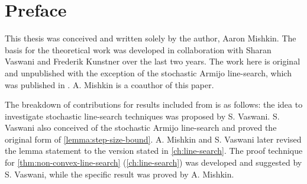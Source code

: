 
\chapter{Preface}

This thesis was conceived and written solely by the author, Aaron Mishkin. 
The basis for the theoretical work was developed in collaboration with Sharan Vaswani and Frederik Kunstner over the last two years.
The work here is original and unpublished with the exception of the stochastic Armijo line-search, which was published in \citet{vaswani2019painless}. 
A. Mishkin is a coauthor of this paper. 

The breakdown of contributions for results included from \citet{vaswani2019painless} is as follows: 
the idea to investigate stochastic line-search techniques was proposed by S. Vaswani.
S. Vaswani also conceived of the stochastic Armijo line-search and proved the original form of \autoref{lemma:step-size-bound}. 
A. Mishkin and S. Vaswani later revised the lemma statement to the version stated in \autoref{ch:line-search}.
The proof technique for \autoref{thm:non-convex-line-search} (\autoref{ch:line-search}) was developed and suggested by S. Vaswani, while the specific result was proved by A. Mishkin. 

\iffalse
The following results from \citet{vaswani2019fast} are not included in this thesis: 
\begin{inparaenum}[(i)]
    \item  the theoretical results for the stochastic Armijo line-search on strongly-convex and convex functions, which are \emph{independent} of the improved theorems in \autoref{ch:line-search}, were established by S. Vaswani and modified to ensure correctness by A. Mishkin; 
    \item the convergence results for bilinear problems, proved by Gauthier Gidel in collaboration with S. Vaswani; 
    \item the experiments on logistic regression and matrix factorization, conducted by A. Mishkin; and 
    \item the experiments on deep neural networks, conducted by Issam Laradji and S. Vaswani.
\end{inparaenum}
In addition to the above, Simon Lacoste-Julien and Mark Schmidt provided guidance and useful feedback on the writing of \citet{vaswani2019fast}.
No text from that work is reproduced here.
\fi

